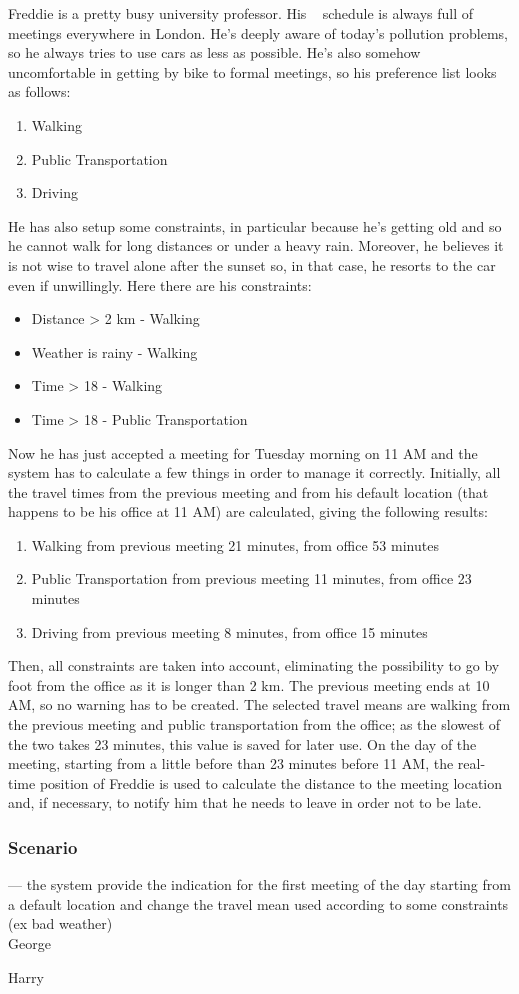 Freddie is a pretty busy university professor. His \projectname~ schedule is always full of meetings everywhere in London. He's deeply aware of today's pollution problems, so he always tries to use cars as less as possible. He's also somehow uncomfortable in getting by bike to formal meetings, so his preference list looks as follows:
\begin{enumerate}
\item Walking
\item Public Transportation
\item Driving
\end{enumerate}
He has also setup some constraints, in particular because he's getting old and so he cannot walk for long distances or under a heavy rain. Moreover, he believes it is not wise to travel alone after the sunset so, in that case, he resorts to the car even if unwillingly. Here there are his constraints:
\begin{itemize}
\item Distance > 2 km - Walking
\item Weather is rainy - Walking
\item Time > 18 - Walking
\item Time > 18 - Public Transportation
\end{itemize}
Now he has just accepted a meeting for Tuesday morning on 11 AM and the system has to calculate a few things in order to manage it correctly. Initially, all the travel times from the previous meeting and from his default location (that happens to be his office at 11 AM) are calculated, giving the following results:
\begin{enumerate}
\item Walking		from previous meeting 21 minutes, from office 53 minutes 
\item Public Transportation		from previous meeting 11 minutes, from office 23 minutes
\item Driving		from previous meeting 8 minutes, from office 15 minutes
\end{enumerate}
Then, all constraints are taken into account, eliminating the possibility to go by foot from the office as it is longer than 2 km. The previous meeting ends at 10 AM, so no warning has to be created. The selected travel means are walking from the previous meeting and public transportation from the office; as the slowest of the two takes 23 minutes, this value is saved for later use. On the day of the meeting, starting from a little before than 23 minutes before 11 AM, the real-time position of Freddie is used to calculate the distance to the meeting location and, if necessary, to notify him that he needs to leave in order not to be late.


\subsubsection{Scenario \thecountScenarios }
--- the system provide the indication for the first meeting of the day starting from a default location and change the travel mean used according to some constraints (ex bad weather)\\

George

Harry
